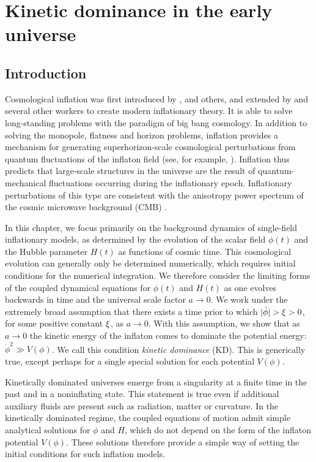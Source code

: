 \chapter{Kinetic dominance in the early universe}
\label{chap:kd}

\section{Introduction}

Cosmological inflation was first introduced by \citet{starobinskii_spectrum_1979}, \citet{guth_inflationary_1981} and others, and extended by \citet{linde_1982} and several other workers to create modern inflationary theory. It is able to solve long-standing problems with the paradigm of big bang cosmology. In addition to solving the monopole, flatness and horizon problems, inflation provides a mechanism for generating superhorizon-scale cosmological perturbations from quantum fluctuations of the inflaton field (see, for example, \citet{mukhanov_theory_1992}). Inflation thus predicts that large-scale structures in the universe are the result of quantum-mechanical fluctuations occurring during the inflationary epoch. Inflationary perturbations of this type are consistent with the anisotropy power spectrum of the cosmic microwave background (CMB) \citep{hinshaw_nine-year_2012,planck_collaboration_planck_2013}.

In this chapter, we focus primarily on the background dynamics of single-field inflationary models, as determined by the evolution of the scalar field \(\phi(t)\) and the Hubble parameter \(H(t)\) as functions of cosmic time.  This cosmological evolution can generally only be determined numerically, which requires initial conditions for the numerical integration.  We therefore consider the limiting forms of the coupled dynamical equations for \(\phi(t)\) and \(H(t)\) as one evolves backwards in time and the universal scale factor \(a\to 0\). We work under the extremely broad assumption that there exists a time prior to which \(|\dot{\phi}| > \xi > 0\), for some positive constant \(\xi\), as \(a \to 0\).  With this assumption, we show that as \(a\to 0\) the kinetic energy of the inflaton comes to dominate the potential energy: \(\dot{\phi}^2\gg V(\phi)\). We call this condition {\em kinetic dominance\/} (KD). This is generically true, except perhaps for a single special solution for each potential \(V(\phi)\).

Kinetically dominated universes emerge from a singularity at a finite time in the past and in a noninflating state. This statement is true even if additional auxiliary fluids are present such as radiation, matter or curvature.  In the kinetically dominated regime, the coupled equations of motion admit simple analytical solutions for \(\phi\) and \(H\), which do not depend on the form of the inflaton potential \(V(\phi)\).  These solutions therefore provide a simple way of setting the initial conditions for such inflation models.

